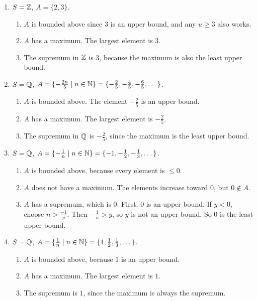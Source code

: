 \documentclass{report}
\begin{document}
\begin{proofWithHibiscus}
  \begin{enumerate}
    \item $S = \mathbb{Z}$, $A = \{2,3\}$. 
      \begin{enumerate}
        \item $A$ is bounded above since $3$ is an upper bound, and any $u \ge 3$ also works.  
        \item $A$ has a maximum. The largest element is $3$.  
        \item The supremum in $\mathbb{Z}$ is $3$, because the maximum is also the least upper bound.  
      \end{enumerate}
  
    \item $S = \mathbb{Q}$, $A = \{-\tfrac{2n}{5} \mid n \in \mathbb{N}\} = \{-\tfrac25, -\tfrac45, -\tfrac65, \dots\}$.  
      \begin{enumerate}
        \item $A$ is bounded above. The element $-\tfrac25$ is an upper bound.  
        \item $A$ has a maximum. The largest element is $-\tfrac25$.  
        \item The supremum in $\mathbb{Q}$ is $-\tfrac25$, since the maximum is the least upper bound.  
      \end{enumerate}
  
    \item $S = \mathbb{Q}$, $A = \{-\tfrac{1}{n} \mid n \in \mathbb{N}\} = \{-1, -\tfrac12, -\tfrac13, \dots\}$.  
      \begin{enumerate}
        \item $A$ is bounded above, because every element is $\le 0$.  
        \item $A$ does not have a maximum. The elements increase toward $0$, but $0 \notin A$.  
        \item $A$ has a supremum, which is $0$. First, $0$ is an upper bound. If $y<0$, choose $n > \frac{-1}{y}$. Then $-\tfrac1n > y$, so $y$ is not an upper bound. So $0$ is the least upper bound.  
      \end{enumerate}
  
    \item $S = \mathbb{Q}$, $A = \{\tfrac{1}{n} \mid n \in \mathbb{N}\} = \{1, \tfrac12, \tfrac13, \dots\}$.  
      \begin{enumerate}
        \item $A$ is bounded above, because $1$ is an upper bound.  
        \item $A$ has a maximum. The largest element is $1$.  
        \item The supremum is $1$, since the maximum is always the supremum.  
      \end{enumerate}
  

\end{enumerate}
\end{proofWithHibiscus}
\end{document}
